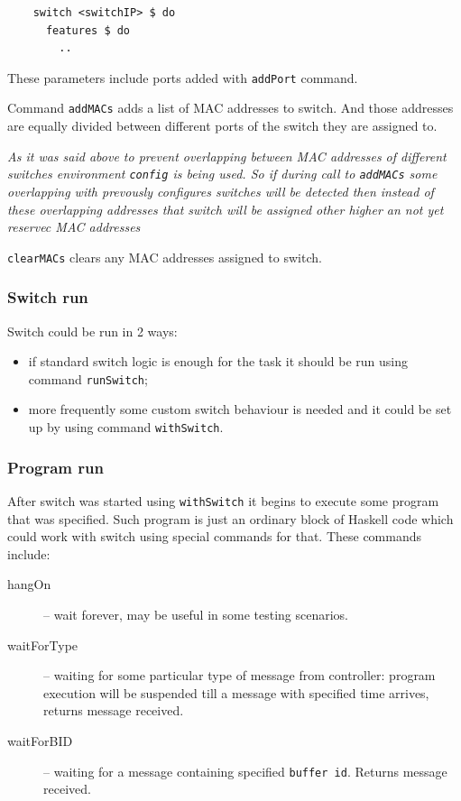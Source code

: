 \documentclass[9pt,a4paper]{article}
\begin{document}
\begin{lstlisting}
    switch <switchIP> $ do
      features $ do
        ..
\end{lstlisting}

These parameters include ports added with \lstinline!addPort! command.

Command \lstinline!addMACs! adds a list of MAC addresses to
switch. And those addresses are equally divided between different
ports of the switch they are assigned to.

\emph{As it was said above to prevent overlapping between MAC
  addresses of different switches environment \lstinline!config! is
  being used. So if during call to \lstinline!addMACs! some
  overlapping with prevously configures switches will be detected then
  instead of these overlapping addresses that switch will be assigned
  other higher an not yet reservec MAC addresses}

\lstinline!clearMACs! clears any MAC addresses assigned to switch.


\subsubsection{Switch run}

Switch could be run in 2 ways:

\begin{itemize}
  \item if standard switch logic is enough for the task it should be
    run using command \lstinline!runSwitch!;
  \item more frequently some custom switch behaviour is needed and it
    could be set up by using command \lstinline!withSwitch!.
\end{itemize}


\subsubsection{Program run}

After switch was started using \lstinline!withSwitch! it begins to
execute some program that was specified. Such program is just an
ordinary block of Haskell code which could work with switch using
special commands for that. These commands include:

\begin{description}
  \item[hangOn] -- wait forever, may be useful in some testing scenarios.

  \item[waitForType] -- waiting for some particular type of message
    from controller: program execution will be suspended till a
    message with specified time arrives, returns message received.

  \item[waitForBID] -- waiting for a message containing specified
    \lstinline!buffer id!.  Returns message received.

\end{description}
\end{document}
